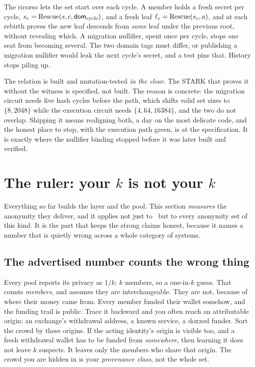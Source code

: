 \documentclass[11pt]{article}
\begin{document}
The ricorso lets the set start over each cycle. A member holds a fresh secret per cycle,
$s_c = \mathrm{Rescue}(s, c, \textsf{dom}_{\text{cycle}})$, and a fresh leaf $\ell_c =
\mathrm{Rescue}(s_c, a)$, and at each rebirth proves the new leaf descends from \emph{some} leaf
under the previous root, without revealing which. A migration nullifier, spent once per
cycle, stops one seat from becoming several. The two domain tags must differ, or
publishing a migration nullifier would leak the next cycle's secret, and a test pins
that. History stops piling up.

\begin{honest}
The relation is built and mutation-tested \emph{in the clear}. The STARK that proves it
without the witness is specified, not built. The reason is concrete: the migration
circuit needs five hash cycles before the path, which shifts valid set sizes to
$\{8, 2048\}$ while the execution circuit needs $\{4, 64, 16384\}$, and the two do not
overlap. Shipping it means realigning both, a day on the most delicate code, and the
honest place to stop, with the execution path green, is at the specification. It is
exactly where the nullifier binding stopped before it was later built and verified.
\end{honest}

\section{The ruler: your $k$ is not your $k$}
\label{sec:ruler}

Everything so far builds the layer and the pool. This section \emph{measures} the
anonymity they deliver, and it applies not just to \river\ but to every anonymity set of
this kind. It is the part that keeps the strong claims honest, because it names a number
that is quietly wrong across a whole category of systems.

\subsection{The advertised number counts the wrong thing}

Every pool reports its privacy as $1/k$: $k$ members, so a one-in-$k$ guess. That counts
\emph{members}, and assumes they are interchangeable. They are not, because of where
their money came from. Every member funded their wallet somehow, and the funding trail
is public. Trace it backward and you often reach an attributable origin: an exchange's
withdrawal address, a known service, a doxxed funder. Sort the crowd by these origins.
If the acting identity's origin is visible too, and a fresh withdrawal wallet has to be
funded from \emph{somewhere}, then learning it does not leave $k$ suspects. It leaves
only the members who share that origin. The crowd you are hidden in is your
\emph{provenance class}, not the whole set.
\end{document}
